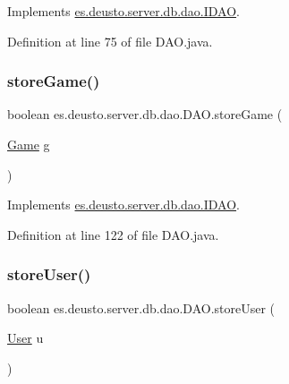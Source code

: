 Implements \hyperlink{interfacees_1_1deusto_1_1server_1_1db_1_1dao_1_1_i_d_a_o_a19f9b0d0b6f5f80730d6d197deca7dfc}{es.\+deusto.\+server.\+db.\+dao.\+I\+D\+AO}.



Definition at line 75 of file D\+A\+O.\+java.

\mbox{\label{classes_1_1deusto_1_1server_1_1db_1_1dao_1_1_d_a_o_a7484309d9b9b39c24cd7d0413a90c468}} 
\subsubsection{\texorpdfstring{store\+Game()}{storeGame()}}
{\footnotesize\ttfamily boolean es.\+deusto.\+server.\+db.\+dao.\+D\+A\+O.\+store\+Game (\begin{DoxyParamCaption}\item[{\hyperlink{classes_1_1deusto_1_1server_1_1db_1_1data_1_1_game}{Game}}]{g }\end{DoxyParamCaption})}



Implements \hyperlink{interfacees_1_1deusto_1_1server_1_1db_1_1dao_1_1_i_d_a_o_ab38972c7c70c95b4c409fa7758ef2fc3}{es.\+deusto.\+server.\+db.\+dao.\+I\+D\+AO}.



Definition at line 122 of file D\+A\+O.\+java.

\mbox{\label{classes_1_1deusto_1_1server_1_1db_1_1dao_1_1_d_a_o_acb146e96959c340ef828ef8e36b4283c}} 
\subsubsection{\texorpdfstring{store\+User()}{storeUser()}}
{\footnotesize\ttfamily boolean es.\+deusto.\+server.\+db.\+dao.\+D\+A\+O.\+store\+User (\begin{DoxyParamCaption}\item[{\hyperlink{classes_1_1deusto_1_1server_1_1db_1_1data_1_1_user}{User}}]{u }\end{DoxyParamCaption})}

